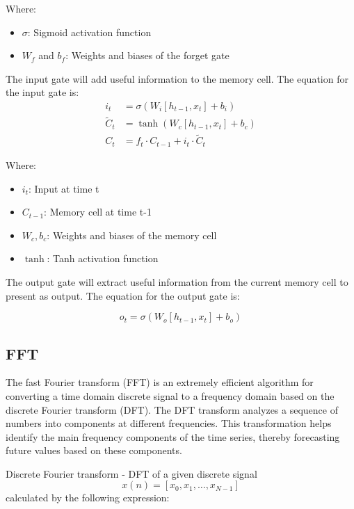 \documentclass{ieeeojies}
\begin{document}
Where:
\begin{itemize}
    \item $\sigma$: Sigmoid activation function
    \item $W_f$ and $b_f$: Weights and biases of the forget gate
\end{itemize}

The input gate will add useful information to the memory cell. The equation for the input gate is:
\\
\begin{align*}
    i_t &= \sigma(W_i [h_{t-1}, x_t] + b_i) \\
    \tilde{C}_t &= \tanh(W_c [h_{t-1}, x_t] + b_c) \\
    C_t &= f_t \cdot C_{t-1} + i_t \cdot \tilde{C}_t
\end{align*}

Where:
\begin{itemize}
    \item $i_t$: Input at time t
    \item $C_{t-1}$: Memory cell at time t-1
    \item $W_c, b_c$: Weights and biases of the memory cell
    \item $\tanh$: Tanh activation function
\end{itemize}

The output gate will extract useful information from the current memory cell to present as output. The equation for the output gate is:

\begin{equation*}
    o_t = \sigma(W_o [h_{t-1}, x_t] + b_o)
\end{equation*}
    



\subsection{FFT}

The fast Fourier transform (FFT) is an extremely efficient algorithm for converting a time domain discrete signal to a frequency domain based on the discrete Fourier transform (DFT). The DFT transform analyzes a sequence of numbers into components at different frequencies. This transformation helps identify the main frequency components of the time series, thereby forecasting future values based on these components.

Discrete Fourier transform - DFT of a given discrete signal 
\[
x(n) = [x_0, x_1, \ldots, x_{N-1}]
\] 
calculated by the following expression:
\end{document}
